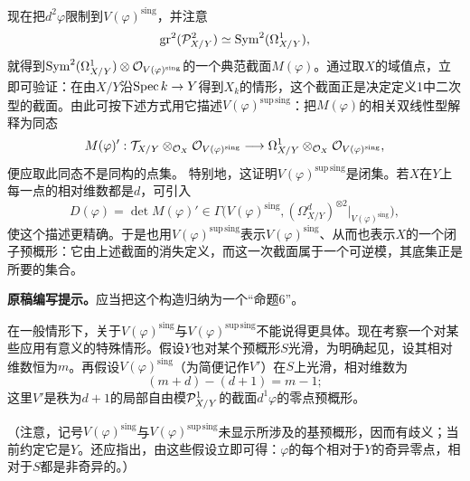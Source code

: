 现在把$d^2\varphi$限制到$V(\varphi)^{\mathrm{sing}}$，并注意
\[
 \operatorname{gr}^2(\mathcal P^2_{X/Y})\simeq\operatorname{Sym}^2(\Omega^1_{X/Y}),
\]
就得到$\operatorname{Sym}^2(\Omega^1_{X/Y})\otimes\mathcal O_{V(\varphi)^{\mathrm{sing}}}$的一个典范截面$M(\varphi)$。通过取$X$的域值点，立即可验证：在由$X/Y$沿$\operatorname{Spec} k\to Y$得到$X_k$的情形，这个截面正是决定定义1中二次型的截面。由此可按下述方式用它描述$V(\varphi)^{\mathrm{sup\,sing}}$：把$M(\varphi)$的相关双线性型解释为同态
\[
 M(\varphi)' :
 \mathcal T_{X/Y}\otimes_{\mathcal O_X}\mathcal O_{V(\varphi)^{\mathrm{sing}}}
 \longrightarrow
 \Omega^1_{X/Y}\otimes_{\mathcal O_X}\mathcal O_{V(\varphi)^{\mathrm{sing}}},
\]
便应取此同态不是同构的点集。
特别地，这证明$V(\varphi)^{\mathrm{sup\,sing}}$是闭集。若$X$在$Y$上每一点的相对维数都是$d$，可引入
\[
 D(\varphi)=\det M(\varphi)'
 \in\Gamma\bigl(V(\varphi)^{\mathrm{sing}},
       (\Omega^d_{X/Y})^{\otimes2}|_{V(\varphi)^{\mathrm{sing}}}\bigr),
\]
使这个描述更精确。于是也用$V(\varphi)^{\mathrm{sup\,sing}}$表示$V(\varphi)^{\mathrm{sing}}$、从而也表示$X$的一个闭子预概形：它由上述截面的消失定义，而这一次截面属于一个可逆模，其底集正是所要的集合。

\noindent\textbf{原稿编写提示。}应当把这个构造归纳为一个“命题6”。

在一般情形下，关于$V(\varphi)^{\mathrm{sing}}$与$V(\varphi)^{\mathrm{sup\,sing}}$不能说得更具体。现在考察一个对某些应用有意义的特殊情形。假设$Y$也对某个预概形$S$光滑，为明确起见，设其相对维数恒为$m$。再假设$V(\varphi)^{\mathrm{sing}}$（为简便记作$V'$）在$S$上光滑，相对维数为
\[
 (m+d)-(d+1)=m-1;
\]
这里$V'$是秩为$d+1$的局部自由模$\mathcal P^1_{X/Y}$的截面$d^1\varphi$的零点预概形。

（注意，记号$V(\varphi)^{\mathrm{sing}}$与$V(\varphi)^{\mathrm{sup\,sing}}$未显示所涉及的基预概形，因而有歧义；当前约定它是$Y$。还应指出，由这些假设立即可得：$\varphi$的每个相对于$Y$的奇异零点，相对于$S$都是非奇异的。）

